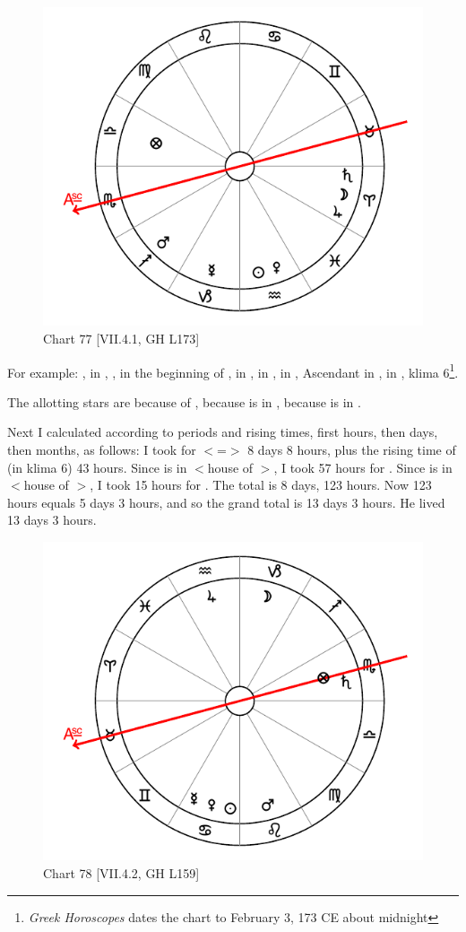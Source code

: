 \begin{figure}
\centering
\vspace{-10pt}
\includegraphics[width=.68\textwidth]{charts/7_4_1}
\caption{Chart 77 [VII.4.1, GH L173]}
\label{fig:chart77}
\end{figure} 

\noindent For example: \Sun, \Venus\xspace in \Aquarius, \Moon, \Jupiter\xspace in the beginning of \Aries, \Saturn\xspace in \Aries, \Mars\xspace in \Sagittarius, \Mercury\xspace in \Capricorn, Ascendant in \Scorpio, \Fortune in \Libra, klima 6\footnote{\textit{Greek Horoscopes} dates the chart to February 3, 173 CE about midnight}. 

\noindent The allotting stars are \Venus\xspace because of \Libra, \Saturn\xspace because \Venus\xspace is in \Aquarius, \Mars\xspace because \Saturn\xspace is in \Aries. 

\noindent Next I calculated according to periods and rising times, first hours, then days, then months, as follows: I took for \Libra\xspace $<$=\Venus$>$ 8 days 8 hours, plus the rising time of \Libra (in klima 6) 43 hours. Since \Venus\xspace is in \Aquarius\xspace $<$house of \Saturn$>$, I took 57 hours for \Saturn. Since \Saturn\xspace is in \Aries\xspace $<$house of \Mars$>$, I took 15 hours for \Mars. The total is 8 days, 123 hours. Now 123 hours equals 5 days 3 hours, and so the grand total is 13 days 3 hours. He lived 13 days 3 hours.

\begin{figure}
\centering
\vspace{-10pt}
\includegraphics[width=.68\textwidth]{charts/7_4_2}
\caption{Chart 78 [VII.4.2, GH L159]}
\label{fig:chart78}
\end{figure} 

